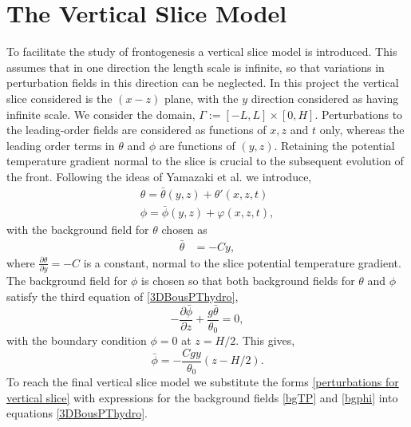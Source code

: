 \section{The Vertical Slice Model}
To facilitate the study of frontogenesis a vertical slice model is introduced. This assumes that in one direction the length scale is infinite, so that variations in perturbation fields in this direction can be neglected.  In this project the vertical slice considered is the $\left(x-z\right)$ plane, with the $y$ direction considered as having infinite scale. We consider the domain, $\Gamma := [-L,L] \times [0,H]$. Perturbations to the leading-order fields are considered as functions of $x,z$ and $t$ only, whereas the leading order terms in $\theta$ and $\phi$ are functions of $\left(y,z\right)$. Retaining the potential temperature gradient normal to the slice is crucial to the subsequent evolution of the front. Following the ideas of Yamazaki et al. \cite{Yamazaki2017} we introduce,
\begin{equation}
	\begin{aligned}
		\theta = \bar{\theta}(y,z) + \theta'(x,z,t)\\ 
		\phi = \bar{\phi}(y,z) + \varphi(x,z,t),
	\end{aligned}
\label{perturbations for vertical slice}
\end{equation}
with the background field for $\theta$ chosen as
\begin{equation}
	\begin{aligned}
		\bar{\theta} &= -Cy,
	\end{aligned}
\label{bgTP}
\end{equation}
where $\frac{\partial \theta}{\partial y} = -C$ is a constant, normal to the slice potential temperature gradient.\\
\linebreak
The background field for $\phi$ is chosen so that both background fields for $\theta $ and $\phi $ satisfy the third equation of \ref{3DBousPThydro},
\begin{equation*}
	-\frac{\partial \bar{\phi}}{\partial z} + \frac{g\bar{\theta}}{\theta_0} = 0,
\end{equation*}
with the boundary condition $\phi = 0$ at $z = H/2$. This gives,
\begin{equation}
	\bar{\phi} = -\frac{Cgy}{\theta_0}\left(z - H/2\right).
\label{bgphi}
\end{equation}
\linebreak
To reach the final vertical slice model we substitute the forms \ref{perturbations for vertical slice} with expressions for the background fields \ref{bgTP} and \ref{bgphi} into equations \ref{3DBousPThydro}. 
